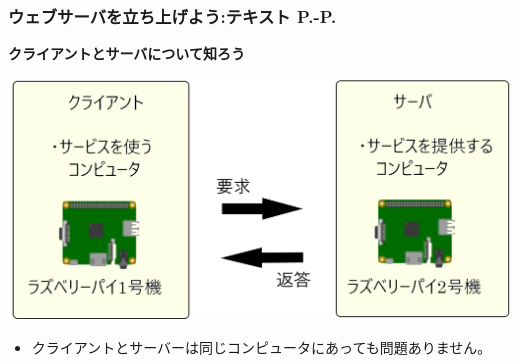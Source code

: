 \documentclass[dvipdfmx]{beamer}
\begin{document}
\begin{frame}[fragile]
	\frametitle{ウェブサーバを立ち上げよう:テキスト P.\pageref{1:P:HP}-P.\pageref{1:P:CGI}~~~}
    \large\textbf{クライアントとサーバについて知ろう}\\
			\begin{minipage}{\textwidth}
                {\upshape
                  \includegraphics[width=\textwidth]{slide07-img014.png}}
            \end{minipage}
            \begin{itemize}
                \item クライアントとサーバーは同じコンピュータにあっても問題ありません。
            \end{itemize}
\end{frame}
\end{document}

